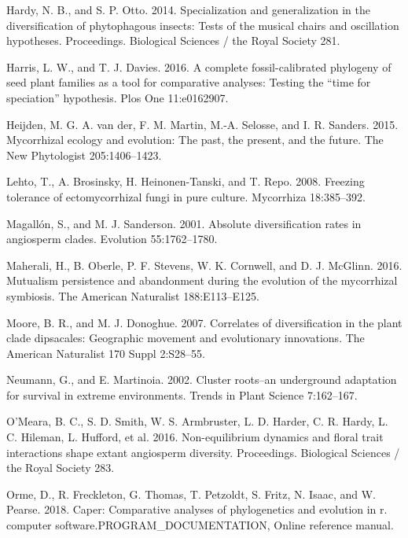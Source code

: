 \documentclass[
  12pt,
]{article}
\newenvironment{cslreferences}%
  {}%
  {\par}
\begin{document}
\begin{cslreferences}
\leavevmode\hypertarget{ref-hardy_2014}{}%
Hardy, N. B., and S. P. Otto. 2014. Specialization and generalization in
the diversification of phytophagous insects: Tests of the musical chairs
and oscillation hypotheses. Proceedings. Biological Sciences / the Royal
Society 281.

\leavevmode\hypertarget{ref-Harris_Davies_2016}{}%
Harris, L. W., and T. J. Davies. 2016. A complete fossil-calibrated
phylogeny of seed plant families as a tool for comparative analyses:
Testing the ``time for speciation'' hypothesis. Plos One 11:e0162907.

\leavevmode\hypertarget{ref-vanderheijden_2015}{}%
Heijden, M. G. A. van der, F. M. Martin, M.-A. Selosse, and I. R.
Sanders. 2015. Mycorrhizal ecology and evolution: The past, the present,
and the future. The New Phytologist 205:1406--1423.

\leavevmode\hypertarget{ref-lehto_2008}{}%
Lehto, T., A. Brosinsky, H. Heinonen-Tanski, and T. Repo. 2008. Freezing
tolerance of ectomycorrhizal fungi in pure culture. Mycorrhiza
18:385--392.

\leavevmode\hypertarget{ref-magalln_2001}{}%
Magallón, S., and M. J. Sanderson. 2001. Absolute diversification rates
in angiosperm clades. Evolution 55:1762--1780.

\leavevmode\hypertarget{ref-maherali_2016}{}%
Maherali, H., B. Oberle, P. F. Stevens, W. K. Cornwell, and D. J.
McGlinn. 2016. Mutualism persistence and abandonment during the
evolution of the mycorrhizal symbiosis. The American Naturalist
188:E113--E125.

\leavevmode\hypertarget{ref-moore_2007}{}%
Moore, B. R., and M. J. Donoghue. 2007. Correlates of diversification in
the plant clade dipsacales: Geographic movement and evolutionary
innovations. The American Naturalist 170 Suppl 2:S28--55.

\leavevmode\hypertarget{ref-neumann_2002}{}%
Neumann, G., and E. Martinoia. 2002. Cluster roots--an underground
adaptation for survival in extreme environments. Trends in Plant Science
7:162--167.

\leavevmode\hypertarget{ref-omeara_2016}{}%
O'Meara, B. C., S. D. Smith, W. S. Armbruster, L. D. Harder, C. R.
Hardy, L. C. Hileman, L. Hufford, et al. 2016. Non-equilibrium dynamics
and floral trait interactions shape extant angiosperm diversity.
Proceedings. Biological Sciences / the Royal Society 283.

\leavevmode\hypertarget{ref-orme_software_2018}{}%
Orme, D., R. Freckleton, G. Thomas, T. Petzoldt, S. Fritz, N. Isaac, and
W. Pearse. 2018. Caper: Comparative analyses of phylogenetics and
evolution in r. computer software.PROGRAM\_DOCUMENTATION, Online
reference manual.


\end{cslreferences}
\end{document}
